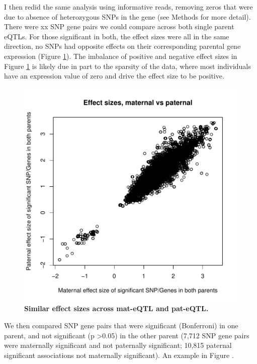 I then redid the same analysis using informative reads, removing zeros that were due to absence of heterozygous SNPs in the gene (see Methods for more detail). There were xx SNP gene pairs we could compare across both single parent eQTLs. For those significant in both, the effect sizes were all in the same direction, no SNPs had opposite effects on their corresponding parental gene expression (Figure \ref{fig:effectsizes}). The imbalance of positive and negative effect sizes in Figure \ref{fig:effectsizes} is likely due in part to the sparsity of the data, where most individuals have an expression value of zero and drive the effect size to be positive.

\begin{figure}[!htb]
\centering \includegraphics[width=5in]{img/ch04/fig-06-effectsizes.pdf}
\caption[Similar effect sizes across mat-eQTL and pat-eQTL.]{\textbf{Similar effect sizes across mat-eQTL and pat-eQTL.} }
\label{fig:effectsizes}
\end{figure}


We then compared SNP gene pairs that were significant (Bonferroni) in one parent, and not significant (p \textgreater 0.05) in the other parent (7,712 SNP gene pairs were maternally significant and not paternally significant; 10,815 paternal significant associations not maternally significant). An example in Figure . 

